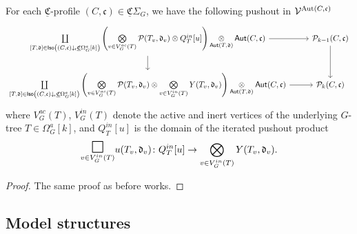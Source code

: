 \documentclass[a4paper,10pt
]{article}%
\newcommand{\UC}{\underline{\mathfrak C}}
\renewcommand{\1}{\ensuremath{\mathbb{id}}}
\begin{document}
\begin{proposition}
      [{cf. \cite[Prop 5.66]{BP17}}]
      For each $\UC$-profile $(C,\mathfrak c) \in \UC\Sigma_G$,
      we have the following pushout in $\mathcal V^{\mathrm{Aut}(C, \mathfrak c)}$
      \begin{equation}\label{FILTRATION_LAN_LEVEL}
            \begin{tikzcd}
                  \coprod\limits_{[T, \mathfrak d] \in \mathsf{Iso}
                    \left((C,\mathfrak c) \downarrow_{\mathsf{r}} \UC\Omega_G^a[k]\right)}
                  \left(
                        \bigotimes\limits_{v \in V_{G}^{ac}(T)}\P(T_v, \mathfrak d_v) \otimes
                        Q_T^{in}[u]
                  \right)
                  \mathop{\otimes}\limits_{\mathsf{Aut}(T, \mathfrak d)} \mathsf{Aut}(C, \mathfrak c)
                  \arrow[r] \arrow[d] &
                  \P_{k-1}(C, \mathfrak c) \arrow[d] 
                  \\
                  \coprod\limits_{[T, \mathfrak d] \in \mathsf{Iso}
                    \left((C, \mathfrak c) \downarrow_{\mathsf{r}} \UC\Omega_G^a[k]\right)}
                  \left(
                        \bigotimes\limits_{v \in V_{G}^{ac}(T)}\P(T_v, \mathfrak d_v) \otimes
                        \bigotimes\limits_{v \in V_{G}^{in}(T)} Y(T_v, \mathfrak d_v)
                  \right)
                  \underset{\mathsf{Aut}(T, \mathfrak d)}{\otimes} \mathsf{Aut}(C, \mathfrak c)
                  \arrow[r] &
                  \P_k(C, \mathfrak c)
            \end{tikzcd}
      \end{equation}
      where $ V_{G}^{ac}(T)$, $V_{G}^{in}(T)$ denote the active and inert vertices of the underlying $G$-tree $T \in \Omega_G^a[k]$,
      and $Q_T^{in}[u]$ is the domain 
      of the iterated pushout product
      \begin{equation}
            \underset{v \in V_G^{in}(T)}
            {\mathlarger{\mathlarger{\mathlarger{\square}}}}u(T_v, \mathfrak d_v)
            \colon
            Q_T^{in}[u] \to
            \bigotimes\limits_{v \in V_{G}^{in}(T)} Y(T_v, \mathfrak d_v).
      \end{equation}
\end{proposition}
\begin{proof}
      The same proof as before works.
\end{proof}

\subsection{Model structures}
\end{document}
